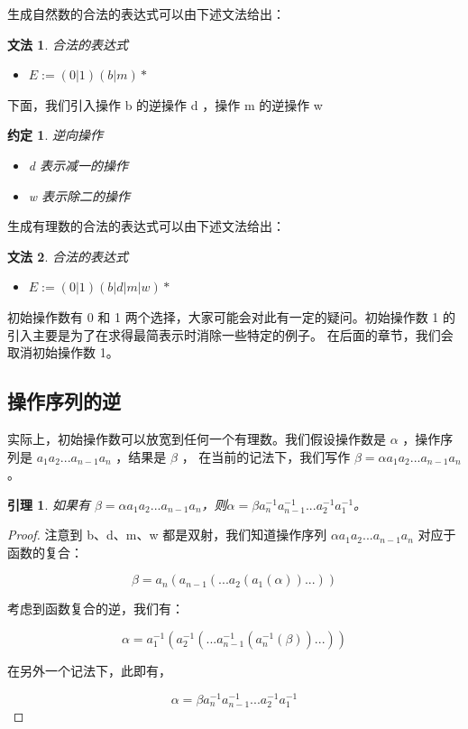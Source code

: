 \documentclass[a4paper,12pt]{article}
\newtheorem{lemma}{引理}
\newtheorem{grammar}{文法}
\newtheorem{convention}{约定}
\begin{document}
生成自然数的合法的表达式可以由下述文法给出：

\begin{grammar}
\label{g1}
合法的表达式
\begin{itemize}
\item $E := (0 | 1)(b | m)*$
\end{itemize}
\end{grammar}

下面，我们引入操作 b 的逆操作 d ，操作 m 的逆操作 w

\begin{convention}
逆向操作
\begin{itemize}
\item d 表示减一的操作
\item w 表示除二的操作
\end{itemize}
\end{convention}

生成有理数的合法的表达式可以由下述文法给出：

\begin{grammar}
\label{g1}
合法的表达式
\begin{itemize}
\item $E := (0 | 1)(b | d | m | w)*$
\end{itemize}
\end{grammar}

初始操作数有 0 和 1 两个选择，大家可能会对此有一定的疑问。初始操作数 1 的引入主要是为了在求得最简表示时消除一些特定的例子。
在后面的章节，我们会取消初始操作数 1。


\subsection{操作序列的逆}

实际上，初始操作数可以放宽到任何一个有理数。我们假设操作数是 $\alpha$ ，操作序列是 $a_1 a_2 ... a_{n-1} a_n$ ，结果是 $\beta$ ，
在当前的记法下，我们写作 $\beta = \alpha a_1 a_2 ... a_{n-1} a_n$。

\begin{lemma}
\label{l1}
如果有 $\beta = \alpha a_1 a_2 ... a_{n-1} a_n$，则$\alpha = \beta a_n^{-1} a_{n-1}^{-1} ... a_2^{-1} a_1^{-1}$。
\end{lemma}

\begin{proof}
注意到 b、d、m、w 都是双射，我们知道操作序列 $\alpha a_1 a_2 ... a_{n-1} a_n$ 对应于函数的复合：

$$\beta = a_n( a_{n-1}( ... a_2( a_1(\alpha) ) ... ) )$$

考虑到函数复合的逆，我们有：

$$\alpha = a_1^{-1}( a_2^{-1}( ... a_{n-1}^{-1}( a_n^{-1}(\beta) ) ... ) )$$

在另外一个记法下，此即有，

$$\alpha = \beta a_n^{-1} a_{n-1}^{-1} ... a_2^{-1} a_1^{-1}$$

\qedhere

\end{proof}
\end{document}
